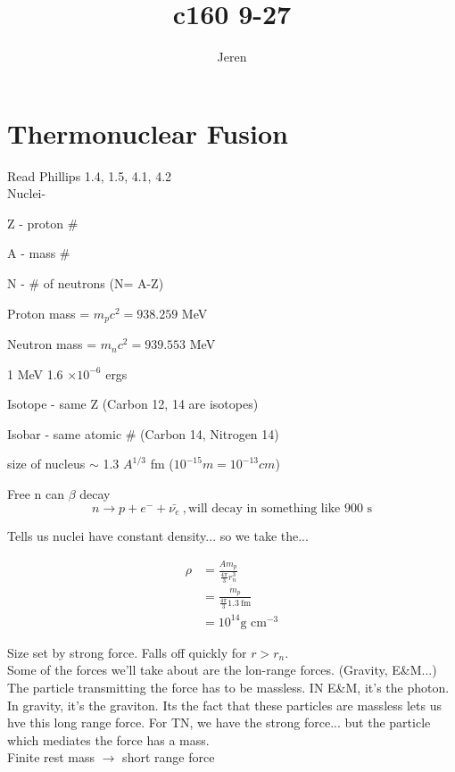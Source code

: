 \documentclass[10pt,a4paper]{article}
\author{Jeren}
\title{c160 9-27}
\begin{document}
\section{Thermonuclear Fusion}
Read Phillips 1.4, 1.5, 4.1, 4.2\\

Nuclei-\\
\begin{list}{*}{}
\item Z - proton \# 
\item A - mass \#
\item N - \# of neutrons (N= A-Z)
\item Proton mass = $m_p c^2 = 938.259$ MeV
\item Neutron mass = $m_n c^2 = 939.553$ MeV
\item 1 MeV 1.6 $\times 10^{-6}$ ergs
\item Isotope - same Z (Carbon 12, 14 are isotopes)
\item Isobar - same atomic \# (Carbon 14, Nitrogen 14)
\item size of nucleus $\sim$ 1.3 $A^{1/3}$ fm  ($10^{-15} m = 10^{-13} cm$)
\end{list}

Free n can $\beta$ decay
\begin{equation}
n \rightarrow p + e^- + \bar{\nu_e}~, \text{will decay in something like 900 s}
\end{equation}

Tells us nuclei have constant density... so we take the...

\begin{align}
\rho & = \frac{A m_p}{\frac{4 \pi}{3}r_n^3} \\
& = \frac{m_p}{\frac{4 \pi }{3}1.3 ~\text{fm}}\\
& = 10^{14} \text{g cm}^{-3}
\end{align}

Size set by strong force. Falls off quickly for $r > r_n$. \\

Some of the forces we'll take about are the lon-range forces. (Gravity, E\&M...) The particle transmitting the force has to be massless. IN E\&M, it's the photon. In gravity, it's the graviton. Its the fact that these particles are massless lets us hve this long range force. For TN, we have the strong force... but the particle which mediates the force has a mass. \\

Finite rest mass $\rightarrow$ short range force\\ 
\end{document}
